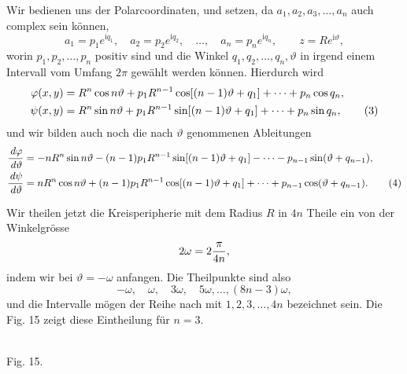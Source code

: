 \documentclass[11pt]{article}
\providecommand{\ii}{\mathrm{i}}
\providecommand{\dd}{\,d}
\begin{document}
Wir bedienen uns der Polarcoordinaten, und setzen, da $a_1,a_2,a_3,\ldots,a_n$ auch complex sein können,
\[
        a_1=p_1e^{\ii q_1},\quad a_2=p_2e^{\ii q_2},\quad\ldots,\quad a_n=p_ne^{\ii q_n},
        \qquad z=Re^{\ii\vartheta},
\]
worin $p_1,p_2,\ldots,p_n$ positiv sind und die Winkel $q_1,q_2,\ldots,q_n,\vartheta$ in irgend einem Intervall vom Umfang $2\pi$ gewählt werden können. Hierdurch wird
\begin{align}
\varphi(x,y)&=R^n\cos n\vartheta+p_1R^{n-1}\cos[(n-1)\vartheta+q_1]+\cdots+p_n\cos q_n,\notag\\
\psi(x,y)&=R^n\sin n\vartheta+p_1R^{n-1}\sin[(n-1)\vartheta+q_1]+\cdots+p_n\sin q_n,
\tag{3}
\end{align}
und wir bilden auch noch die nach $\vartheta$ genommenen Ableitungen
\begin{align}
{\dd\varphi\over\dd\vartheta}
&=-nR^n\sin n\vartheta-(n-1)p_1R^{n-1}\sin[(n-1)\vartheta+q_1]
   -\cdots-p_{n-1}\sin(\vartheta+q_{n-1}),\notag\\
{\dd\psi\over\dd\vartheta}
&=nR^n\cos n\vartheta+(n-1)p_1R^{n-1}\cos[(n-1)\vartheta+q_1]
  +\cdots+p_{n-1}\cos(\vartheta+q_{n-1}).
\tag{4}
\end{align}

Wir theilen jetzt die Kreisperipherie mit dem Radius $R$ in $4n$ Theile ein von der Winkelgrösse
\[
        2\omega=2{\pi\over 4n},
\]
indem wir bei $\vartheta=-\omega$ anfangen. Die Theilpunkte sind also
\[
        -\omega,\quad \omega,\quad 3\omega,\quad 5\omega,\ldots,(8n-3)\omega,
\]
und die Intervalle mögen der Reihe nach mit $1,2,3,\ldots,4n$ bezeichnet sein. Die Fig. 15 zeigt diese Eintheilung für $n=3$.


\begin{center}
\\[-0.2em]
{\small Fig. 15.}
\end{center}
\end{document}
